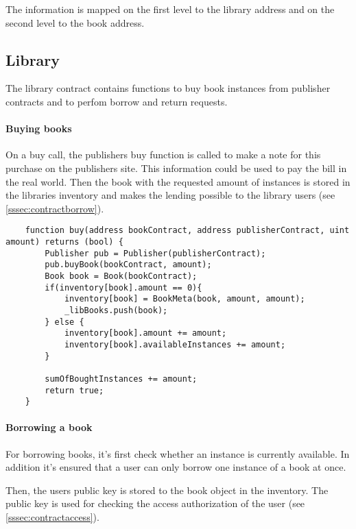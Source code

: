 The information is mapped on the first level to the library address and on the second level to the book address.

\subsection{Library}
The library contract contains functions to buy book instances from publisher contracts and to perfom borrow and return requests.

\paragraph*{Buying books}
On a buy call, the publishers buy function is called to make a note for this purchase on the publishers site. This information could be used to pay the bill in the real world.
Then the book with the requested amount of instances is stored in the libraries inventory and makes the lending possible to the library users (see \ref{sssec:contractborrow}).

\begin{lstlisting}
	function buy(address bookContract, address publisherContract, uint amount) returns (bool) {
		Publisher pub = Publisher(publisherContract);
		pub.buyBook(bookContract, amount);
        Book book = Book(bookContract);
        if(inventory[book].amount == 0){
            inventory[book] = BookMeta(book, amount, amount);
		    _libBooks.push(book);
		} else {
            inventory[book].amount += amount;
            inventory[book].availableInstances += amount;
		}

		sumOfBoughtInstances += amount;
		return true;
	}
\end{lstlisting}


\paragraph*{Borrowing a book \label{sssec:contractborrow}}
For borrowing books, it's first check whether an instance is currently available. In addition it's ensured that a user can only borrow one instance of a book at once.

Then, the users public key is stored to the book object in the inventory. The public key is used for checking the access authorization of the user (see \ref{sssec:contractaccess}).

